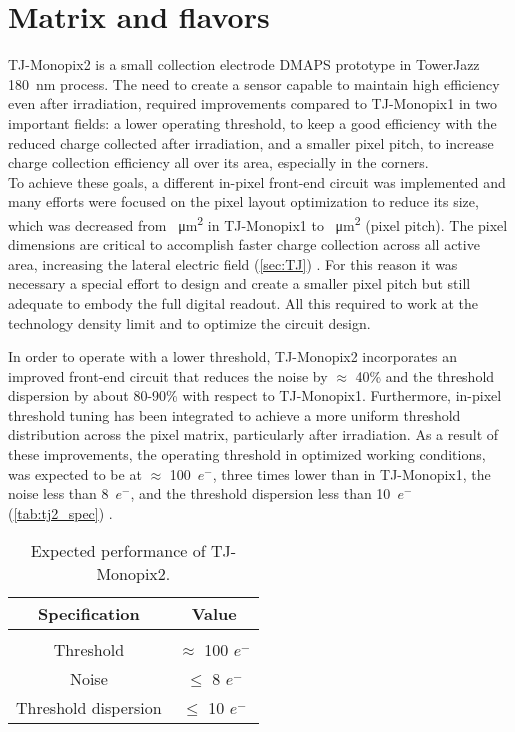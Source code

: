 \section{Matrix and flavors}


TJ-Monopix2 is a small collection electrode DMAPS prototype in TowerJazz \SI{180}{nm} process. The need to create a sensor capable to maintain high efficiency even after irradiation, required improvements compared to TJ-Monopix1 in two important fields: a lower operating threshold,  to keep a good efficiency with the reduced charge collected after irradiation, and a smaller pixel pitch, to increase charge collection efficiency all over its area, especially in the corners.\\

To achieve these goals, a different in-pixel front-end circuit was implemented and many efforts were focused on the pixel layout optimization to reduce its size, which was decreased from ~\unit{\micro m^{2}} in TJ-Monopix1 to ~\unit{\micro m^{2}} (pixel pitch). The pixel dimensions are critical to accomplish faster charge collection across all active area, increasing the lateral electric field (\autoref{sec:TJ}) \cite{Munker_2019}. For this reason it was necessary a special effort to design and create a smaller pixel pitch but still adequate to embody the full digital readout. All this required to work at the technology density limit and to optimize the circuit design.

In order to operate with a lower threshold, TJ-Monopix2 incorporates an improved front-end circuit that reduces the noise by $\approx$ 40\% and the threshold dispersion by about 80-90\% with respect to TJ-Monopix1. Furthermore, in-pixel threshold tuning has been integrated to achieve a more uniform threshold distribution across the pixel matrix, particularly after irradiation. As a result of these improvements, the operating threshold in optimized working conditions, was expected to be at $\approx$ 100~$e^{-}$, three times lower than in TJ-Monopix1, the noise less than 8~$e^{-}$, and the threshold dispersion less than 10~$e^{-}$ (\autoref{tab:tj2_spec}) \cite{Moustakas:2021gjr}. 

\medskip

\begin{table}[h!]
\centering
\begin{tabular}{c|c}
\hline
Specification & Value \\
\hline
\hline \\[-2.5ex]
Threshold & $\approx$ 100 $e^{-}$\\[0.5ex]
\hline
Noise & $\leq$ 8 $e^{-}$ \\ [0.5ex]
\hline
Threshold dispersion & $\leq$ 10 $e^{-}$\\[0.5ex]
\hline
\hline
\end{tabular}
\caption{Expected performance of TJ-Monopix2.}
\label{tab:tj2_spec}
\end{table}


